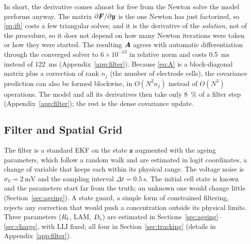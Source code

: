 \documentclass[journal]{IEEEtran}
\newcommand{\vz}{\bm{z}}\newcommand{\vj}{\bm{j}}\newcommand{\vy}{\bm{y}}\newcommand{\vw}{\bm{w}}
\newcommand{\LAM}{\mathrm{LAM}}\newcommand{\LLI}{\mathrm{LLI}}\newcommand{\phipl}{\phi_{\mathrm{pl}}}
\begin{document}
In short, the derivative comes almost for free from the Newton solve the model performs anyway. The matrix $\partial\vF/\partial\vy$ is the one Newton has just factorized, so \eqref{eq:ift} costs a few triangular solves; and it is the derivative of the \emph{solution}, not of the procedure, so it does not depend on how many Newton iterations were taken or how they were started. The resulting $\bm{A}$ agrees with automatic differentiation through the converged solver to $6\times10^{-13}$ in relative norm and costs \SI{0.5}{\milli\second} instead of \SI{122}{\milli\second} (Appendix~\ref{app:filter}). Because \eqref{eq:A} is a block-diagonal matrix plus a correction of rank $n_j$ (the number of electrode cells), the covariance prediction can also be formed blockwise, in $O(N^2n_j)$ instead of $O(N^3)$ operations. The model and all its derivatives then take only \SI{8}{\percent} of a filter step (Appendix~\ref{app:filter}); the rest is the dense covariance update.

\subsection{Filter and Spatial Grid}\label{sec:grid}
The filter is a standard EKF on the state $\vz$ augmented with the ageing parameters, which follow a random walk and are estimated in logit coordinates, a change of variable that keeps each within its physical range. The voltage noise is $\sigma_V=\SI{2}{\milli\volt}$ and the sampling interval $\Delta t=\SI{0.5}{\second}$. The initial cell state is known and the parameters start far from the truth; an unknown one would change little (Section~\ref{sec:ageing}). A state guard, a simple form of constrained filtering\cite{simon2010}, rejects any correction that would push a concentration outside its physical limits. Three parameters ($R_{\mathrm{f}}$, $\LAM$, $D_{\mathrm{s}}$) are estimated in Sections~\ref{sec:ageing}--\ref{sec:charge}, with $\LLI$ fixed; all four in Section~\ref{sec:tracking} (details in Appendix~\ref{app:filter}).
\end{document}
